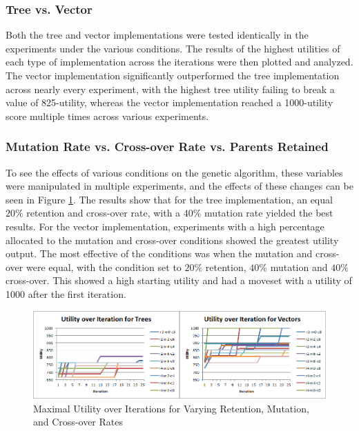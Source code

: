 \documentclass{acm_proc_article-sp}
\begin{document}
    \subsubsection{Tree vs. Vector}

Both the tree and vector implementations were tested identically in the experiments under the various conditions. The results of the highest utilities of each type of implementation across the iterations were then plotted and analyzed. The vector implementation significantly outperformed the tree implementation across nearly every experiment, with the highest tree utility failing to break a value of 825-utility, whereas the vector implementation reached a 1000-utility score multiple times across various experiments. 

    \subsubsection{Mutation Rate vs. Cross-over Rate vs. Parents Retained}

To see the effects of various conditions on the genetic algorithm, these variables were manipulated in multiple experiments, and the effects of these changes can be seen in Figure \ref{utility_experiments}. The results show that for the tree implementation, an equal $20\%$ retention and cross-over rate, with a $40\%$ mutation rate yielded the best results. For the vector implementation, experiments with a high percentage allocated to the mutation and cross-over conditions showed the greatest utility output. The most effective of the conditions was when the mutation and cross-over were equal, with the condition set to $20\%$ retention, $40\%$ mutation and $40\%$ cross-over. This showed a high starting utility and had a moveset with a utility of 1000 after the first iteration.


\begin{figure}[Ht]
    \centering
    \includegraphics[width=\textwidth,keepaspectratio]{./images/gen-mureco-comparison.png}
    \caption{Maximal Utility over Iterations for Varying Retention, Mutation, and Cross-over Rates}
    \label{utility_experiments}
\end{figure}
\end{document}
